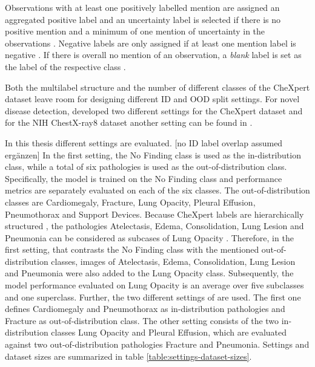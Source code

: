 Observations with at least one positively labelled mention are assigned an aggregated positive label and an uncertainty label is selected if there is no positive mention and a minimum of one mention of uncertainty in the observations \citep{Irvin2019}.
Negative labels are only assigned if at least one mention label is negative \citep{Irvin2019}. 
If there is overall no mention of an observation, a \textit{blank} label is set as the label of the respective class \citep{Irvin2019}.
\par
Both the multilabel structure and the number of different classes of the CheXpert dataset leave room for designing different ID and OOD split settings.
For novel disease detection, \citep{Berger2021} developed two different settings for the CheXpert dataset and for the NIH ChestX-ray8 dataset \citep{Wang2017} another setting can be found in \citep{Cao2020}.
\par
In this thesis different settings are evaluated.
[no ID label overlap assumed ergänzen]
In the first setting, the No Finding class is used as the in-distribution class, while a total of six pathologies is used as the out-of-distribution class.
Specifically, the model is trained on the No Finding class and performance metrics are separately evaluated on each of the six classes.
The out-of-distribution classes are Cardiomegaly, Fracture, Lung Opacity, Pleural Effusion, Pneumothorax and Support Devices.
Because CheXpert labels are hierarchically structured \cite{Irvin2019}, the pathologies Atelectasis, Edema, Consolidation, Lung Lesion and Pneumonia can be considered as subcases of Lung Opacity \textcolor{red}{\citep{Hansell2008}}.
Therefore, in the first setting, that contrasts the No Finding class with the mentioned out-of-distribution classes, images of Atelectasis, Edema, Consolidation, Lung Lesion and Pneumonia were also added to the Lung Opacity class.
Subsequently, the model performance evaluated on Lung Opacity is an average over five subclasses and one superclass.
Further, the two different settings of \citep{Berger2021} are used.
The first one defines Cardiomegaly and Pneumothorax as in-distribution pathologies and Fracture as out-of-distribution class.
The other setting consists of the two in-distribution classes Lung Opacity and Pleural Effusion, which are evaluated against two out-of-distribution pathologies Fracture and Pneumonia.
Settings and dataset sizes are summarized in table \ref{table:settings-dataset-sizes}.
\par
